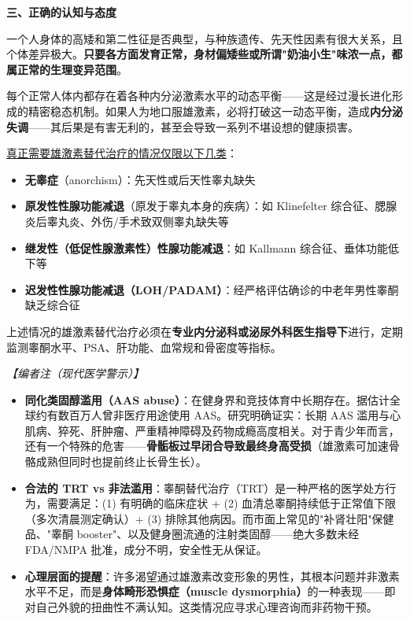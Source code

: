 \vspace{0.5em}
\noindent\textbf{三、正确的认知与态度}

一个人身体的高矮和第二性征是否典型，与种族遗传、先天性因素有很大关系，且个体差异极大。\textbf{只要各方面发育正常，身材偏矮些或所谓"奶油小生"味浓一点，都属正常的生理变异范围}。

每个正常人体内都存在着各种内分泌激素水平的动态平衡——这是经过漫长进化形成的精密稳态机制。如果人为地口服雄激素，必将打破这一动态平衡，造成\textbf{内分泌失调}——其后果是有害无利的，甚至会导致一系列不堪设想的健康损害。

\vspace{0.3em}
\underline{真正需要雄激素替代治疗的情况仅限以下几类}：
\begin{itemize}
	\item \textbf{无睾症}（anorchism）：先天性或后天性睾丸缺失
	\item \textbf{原发性性腺功能减退}（原发于睾丸本身的疾病）：如 Klinefelter 综合征、腮腺炎后睾丸炎、外伤/手术致双侧睾丸缺失等
	\item \textbf{继发性（低促性腺激素性）性腺功能减退}：如 Kallmann 综合征、垂体功能低下等
	\item \textbf{迟发性性腺功能减退（LOH/PADAM）}：经严格评估确诊的中老年男性睾酮缺乏综合征
\end{itemize}

上述情况的雄激素替代治疗必须在\textbf{专业内分泌科或泌尿外科医生指导下}进行，定期监测睾酮水平、PSA、肝功能、血常规和骨密度等指标。

\vspace{0.5em}
\noindent\textit{【编者注（现代医学警示）】}
\begin{itemize}
	\item \textbf{同化类固醇滥用（AAS abuse）}：在健身界和竞技体育中长期存在。据估计全球约有数百万人曾非医疗用途使用 AAS。研究明确证实：长期 AAS 滥用与心肌病、猝死、肝肿瘤、严重精神障碍及药物成瘾高度相关。对于青少年而言，还有一个特殊的危害——\textbf{骨骺板过早闭合导致最终身高受损}（雄激素可加速骨骼成熟但同时也提前终止长骨生长）。
	\item \textbf{合法的 TRT vs 非法滥用}：睾酮替代治疗（TRT）是一种严格的医学处方行为，需要满足：(1) 有明确的临床症状 + (2) 血清总睾酮持续低于正常值下限（多次清晨测定确认）+ (3) 排除其他病因。而市面上常见的"补肾壮阳"保健品、"睾酮 booster"、以及健身圈流通的注射类固醇——绝大多数未经 FDA/NMPA 批准，成分不明，安全性无从保证。
	\item \textbf{心理层面的提醒}：许多渴望通过雄激素改变形象的男性，其根本问题并非激素水平不足，而是\textbf{身体畸形恐惧症（muscle dysmorphia）}的一种表现——即对自己外貌的扭曲性不满认知。这类情况应寻求心理咨询而非药物干预。
\end{itemize}


